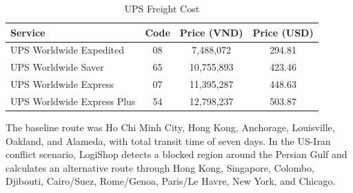 \begin{table}[H]
\centering
\caption{UPS Freight Cost}
\begin{tabular}{lccc}
\toprule
\textbf{Service} & \textbf{Code} & \textbf{Price (VND)} & \textbf{Price (USD)}\\
\midrule
UPS Worldwide Expedited & 08 & 7,488,072 & 294.81\\
UPS Worldwide Saver & 65 & 10,755,893 & 423.46\\
UPS Worldwide Express & 07 & 11,395,287 & 448.63\\
UPS Worldwide Express Plus & 54 & 12,798,237 & 503.87\\
\bottomrule
\end{tabular}
\end{table}

The baseline route was Ho Chi Minh City, Hong Kong, Anchorage, Louisville, Oakland, and Alameda, with total transit time of seven days. In the US-Iran conflict scenario, LogiShop detects a blocked region around the Persian Gulf and calculates an alternative route through Hong Kong, Singapore, Colombo, Djibouti, Cairo/Suez, Rome/Genoa, Paris/Le Havre, New York, and Chicago.


